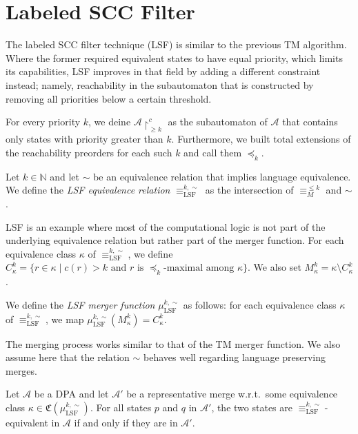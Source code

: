 \section{Labeled SCC Filter}
The labeled SCC filter technique (LSF) is similar to the previous TM algorithm. Where the former required equivalent states to have equal priority, which limits its capabilities, LSF improves in that field by adding a different constraint instead; namely, reachability in the subautomaton that is constructed by removing all priorities below a certain threshold.

For every priority $k$, we deine $\mathcal{A} \upharpoonright^c_{\geq k}$ as the subautomaton of $\mathcal{A}$ that contains only states with priority greater than $k$. Furthermore, we built total extensions of the reachability preorders for each such $k$ and call them $\preceq_k$.

\begin{definition}
	Let $k \in \mathbb{N}$ and let $\sim$ be an equivalence relation that implies language equivalence. We define the \emph{LSF equivalence relation} $\equiv_\text{LSF}^{k,\sim}$ as the intersection of $\equiv_M^{\leq k}$ and $\sim$.
\end{definition}
	
LSF is an example where most of the computational logic is not part of the underlying equivalence relation but rather part of the merger function. For each equivalence class $\kappa$ of $\equiv_\text{LSF}^{k,\sim}$, we define $C_\kappa^k = \{r \in \kappa \mid c(r) > k \text{ and } r \text{ is } \preceq_k \text{-maximal among } \kappa\}$. We also set $M_\kappa^k = \kappa \setminus C_\kappa^k$.
	
\begin{definition}
	We define the \emph{LSF merger function} $\mu_\text{LSF}^{k,\sim}$ as follows: for each equivalence class $\kappa$ of $\equiv_\text{LSF}^{k,\sim}$, we map $\mu_\text{LSF}^{k,\sim}(M_\kappa^k) = C_\kappa^k$.
\end{definition}

The merging process works similar to that of the TM merger function. We also assume here that the relation $\sim$ behaves well regarding language preserving merges.

\begin{lemma}
	Let $\mathcal{A}$ be a DPA and let $\mathcal{A}'$ be a representative merge w.r.t.\ some equivalence class $\kappa \in \mathfrak{C}(\mu_\text{LSF}^{k,\sim})$. For all states $p$ and $q$ in $\mathcal{A}'$, the two states are $\equiv_\text{LSF}^{k,\sim}$-equivalent in $\mathcal{A}$ if and only if they are in $\mathcal{A}'$.
	\label{lem:lsf_kappamerge}
\end{lemma}

